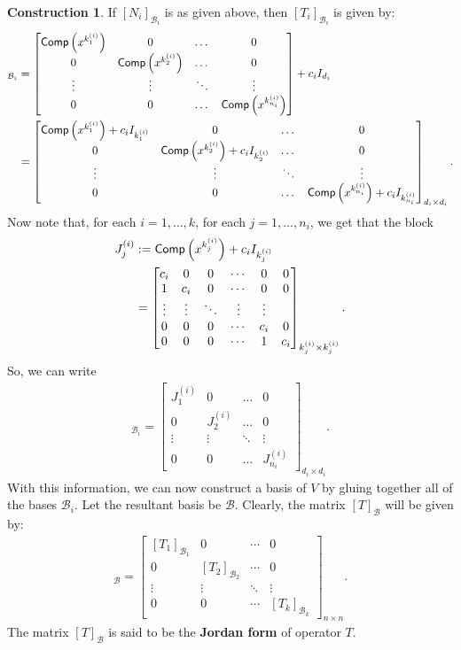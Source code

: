 \documentclass[letterpaper,11pt,twoside]{article}
\theoremstyle{definition}
\theoremstyle{definition}
\theoremstyle{definition}
\theoremstyle{definition}
\theoremstyle{definition}
\newtheorem{construct}[proposition]{\textbf{Construction}}
\theoremstyle{definition}
\theoremstyle{remark}
\theoremstyle{definition}
\newcommand{\Comp}[1]{{\fontfamily{lmss}\selectfont 
            \text{Comp}\left(#1\right)
}}
\begin{document}
\begin{construct}
	If $ [N_i]_{\mathcal{B}_i} $ is as given above, then $ [T_i]_{\mathcal{B}_i} $ is given by:
	\begin{align*}
		[T_i]_{\mathcal{B}_i} &=
		\begin{bmatrix}
			\Comp{x^{k^{(i)}_1}} & 0 & \dots & 0\\
			0 & \Comp{x^{k^{(i)}_2}} & \dots & 0\\
			\vdots & \vdots & \ddots & \vdots \\
			0 & 0 & \dots & \Comp{x^{k^{(i)}_{n_i}}}
		\end{bmatrix} + c_iI_{d_i}\\
		&= \begin{bmatrix}
			\Comp{x^{k^{(i)}_1}} + c_iI_{k_1^{(i)}}& 0 & \dots & 0\\
			0 & \Comp{x^{k^{(i)}_2}} + c_iI_{k_2^{(i)}} & \dots & 0\\
			\vdots & \vdots & \ddots & \vdots \\
			0 & 0 & \dots & \Comp{x^{k^{(i)}_{n_i}}} + c_iI_{k_{n_i}^{(i)}}
		\end{bmatrix}_{d_i\times d_i}.
	\end{align*}
	Now note that, for each $ i=1,\dots,k $, for each $j=1,\dots, n_i  $, we get that the block
	\begin{align*}
		J^{(i)}_{j} &:= \Comp{x^{k^{(i)}_j}} + c_iI_{k^{(i)}_j}\\
		&= \begin{bmatrix}
			c_i&0&0&\cdots&0&0\\
			1&c_i&0&\cdots&0&0\\
			\vdots&\vdots&\ddots&\vdots&\vdots\\
			0&0&0&\cdots&c_i&0\\
			0&0&0&\cdots&1&c_i
		\end{bmatrix}_{k^{(i)}_{j}\times k^{(i)}_{j}}.
	\end{align*}
	So, we can write 
	\begin{align*}
		[T_i]_{\mathcal{B}_i} = \begin{bmatrix}
			J^{(i)}_{1}& 0 & \dots & 0\\
			0 & J^{(i)}_{2} & \dots & 0\\
			\vdots & \vdots & \ddots & \vdots \\
			0 & 0 & \dots & J^{(i)}_{n_i}
		\end{bmatrix}_{d_i\times d_i}.
	\end{align*}
	With this information, we can now construct a basis of $ V $ by gluing together all of the bases $ \mathcal{B}_i $. Let the resultant basis be $ \mathcal{B} $. Clearly, the matrix $ [T]_{\mathcal{B}} $ will be given by:
	\begin{align*}
		[T]_{\mathcal{B}} = \begin{bmatrix}
			[T_1]_{\mathcal{B}_1}&0&\cdots &0\\
			0&[T_2]_{\mathcal{B}_2}&\cdots &0\\
			\vdots &\vdots &\ddots &\vdots\\
			0&0&\cdots &[T_k]_{\mathcal{B}_k}
		\end{bmatrix}_{n\times n}.
	\end{align*}
	The matrix $ [T]_{\mathcal{B}} $ is said to be the \textbf{Jordan form} of operator $ T $.
\end{construct}
\end{document}
